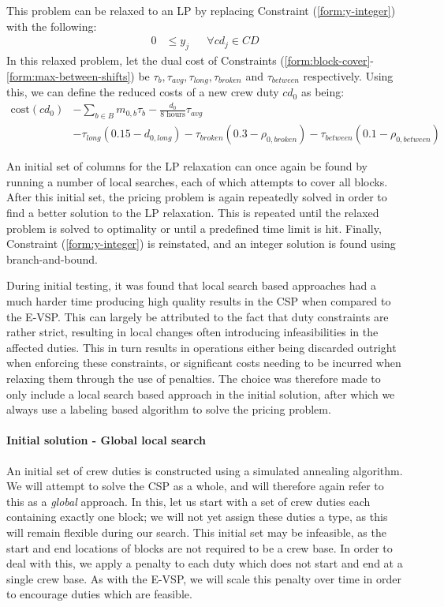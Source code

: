 \documentclass[]{article}
\begin{document}
This problem can be relaxed to an LP by replacing Constraint (\ref{form:y-integer}) with the following:
\begin{align}
0 &\leq y_{j} && \forall cd_j \in \textit{CD}
\end{align}
In this relaxed problem, let the dual cost of Constraints (\ref{form:block-cover}-\ref{form:max-between-shifts}) be $\tau_{b}, \tau_{\textit{avg}}, \tau_{\textit{long}}, \tau_{\textit{broken}}$ and $\tau_{\textit{between}}$ respectively. Using this, we can define the reduced costs of a new crew duty $cd_0$ as being: 
\begin{align}
\text{cost}(cd_0) 
&- \sum_{b \in B} m_{0,b} \tau_{b} 
- \frac{d_0}{\text{8 hours}} \tau_{\textit{avg}} \nonumber \\
&- \tau_{\textit{long}} (0.15 - d_{0,\textit{long}}) 
- \tau_{\textit{broken}} (0.3 - \rho_{0,\textit{broken}}) 
- \tau_{\textit{between}} (0.1 - \rho_{0,\textit{between}})
\end{align}

An initial set of columns for the LP relaxation can once again be found by running a number of local searches, each of which attempts to cover all blocks. After this initial set, the pricing problem is again repeatedly solved in order to find a better solution to the LP relaxation. This is repeated until the relaxed problem is solved to optimality or until a predefined time limit is hit. Finally, Constraint (\ref{form:y-integer}) is reinstated, and an integer solution is found using branch-and-bound.

During initial testing, it was found that local search based approaches had a much harder time producing high quality results in the CSP when compared to the E-VSP. This can largely be attributed to the fact that duty constraints are rather strict, resulting in local changes often introducing infeasibilities in the affected duties. This in turn results in operations either being discarded outright when enforcing these constraints, or significant costs needing to be incurred when relaxing them through the use of penalties. The choice was therefore made to only include a local search based approach in the initial solution, after which we always use a labeling based algorithm to solve the pricing problem.   

\paragraph{Initial solution - Global local search}
An initial set of crew duties is constructed using a simulated annealing algorithm. We will attempt to solve the CSP as a whole, and will therefore again refer to this as a \emph{global} approach. In this, let us start with a set of crew duties each containing exactly one block; we will not yet assign these duties a type, as this will remain flexible during our search. This initial set may be infeasible, as the start and end locations of blocks are not required to be a crew base. In order to deal with this, we apply a penalty to each duty which does not start and end at a single crew base. As with the E-VSP, we will scale this penalty over time in order to encourage duties which are feasible. 
\end{document}
